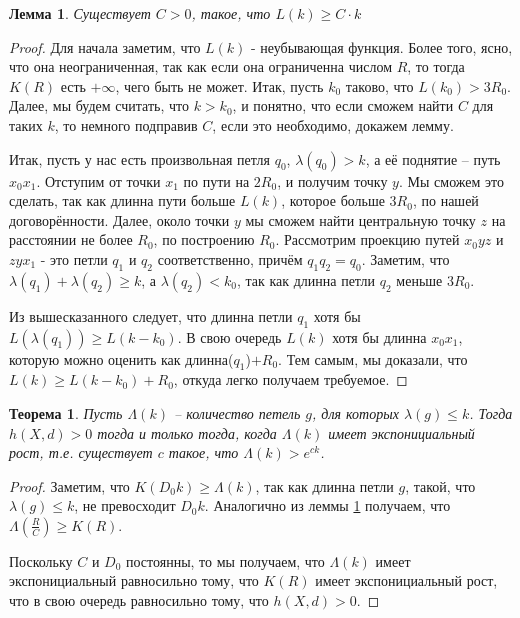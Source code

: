\documentclass[11pt]{article}
\theoremstyle{definition}
\theoremstyle{plain}
\theoremstyle{plain}
\newtheorem{lemma}{Лемма}
\newtheorem{theorem}{Теорема}
\def\leq{\leqslant}
\def\geq{\geqslant}
\begin{document}
\begin{lemma}\label{l_C}
Существует $C > 0$, такое, что $L(k) \geq C \cdot k$
\end{lemma}
\begin{proof}
Для начала заметим, что $L(k)$ - неубывающая функция. Более того, ясно, что она неограниченная, так как если она ограниченна числом $R$, 
то тогда $K(R)$ есть $+\infty$, чего быть не может. Итак, пусть $k_0$ таково, что $L(k_0) > 3 R_0$.
Далее, мы будем считать, что $k > k_0$, и понятно, что если сможем найти $C$ для таких $k$, то немного подправив $C$, если это необходимо, докажем лемму.

Итак, пусть у нас есть произвольная петля $q_0$, $\lambda(q_0) > k$, а её поднятие -- путь $x_0 x_1$.
Отступим от точки $x_1$ по пути на $2R_0$, и получим точку $y$.
Мы сможем это сделать, так как длинна пути больше $L(k)$, которое больше $3R_0$, по нашей договорённости.
Далее, около точки $y$ мы сможем найти центральную точку $z$ на расстоянии не более $R_0$, по построению $R_0$.
Рассмотрим проекцию путей $x_0yz$ и $zyx_1$ - это петли $q_1$ и $q_2$ соответственно, причём $q_1q_2 = q_0$.
Заметим, что $\lambda(q_1) + \lambda(q_2) \geq k$, а $\lambda(q_2) < k_0$, так как длинна петли $q_2$ меньше $3R_0$. 

Из вышесказанного следует, что длинна петли $q_1$ хотя бы $L(\lambda(q_1)) \geq L(k-k_0)$.
В свою очередь $L(k)$ хотя бы длинна $x_0x_1$, которую можно оценить как длинна($q_1$)$+ R_0$. 
Тем самым, мы доказали, что $L(k) \geq L(k-k_0) + R_0$, откуда легко получаем требуемое.
\end{proof}


\begin{theorem}
Пусть $\Lambda(k)$ -- количество петель $g$, для которых $\lambda(g) \leq k$. 
Тогда $h(X, d) > 0$ тогда и только тогда, когда $\Lambda(k)$ имеет экспонициальный рост, 
т.е. существует $c$ такое, что $\Lambda(k) > e^{ck}$.
\end{theorem}

\begin{proof}
Заметим, что $K(D_0 k) \geq \Lambda(k)$, так как длинна петли $g$, такой, что $\lambda(g) \leq k$, не превосходит $D_0 k$.
Аналогично из леммы \ref{l_C} получаем, что $\Lambda(\frac{R}{C}) \geq K(R)$.

Поскольку $C$ и $D_0$ постоянны, то мы получаем, что $\Lambda(k)$ имеет экспонициальный равносильно тому, что $K(R)$ имеет экспонициальный рост, 
что в свою очередь равносильно тому, что $h(X, d) > 0$.
\end{proof}
\end{document}
